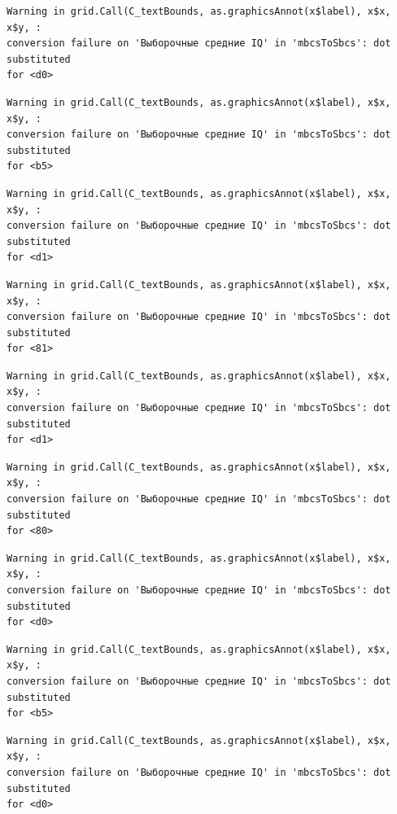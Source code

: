 \documentclass[
  letterpaper,
  DIV=11,
  numbers=noendperiod]{scrreprt}
\theoremstyle{definition}
\theoremstyle{remark}
\begin{document}
\begin{verbatim}
Warning in grid.Call(C_textBounds, as.graphicsAnnot(x$label), x$x, x$y, :
conversion failure on 'Выборочные средние IQ' in 'mbcsToSbcs': dot substituted
for <d0>
\end{verbatim}

\begin{verbatim}
Warning in grid.Call(C_textBounds, as.graphicsAnnot(x$label), x$x, x$y, :
conversion failure on 'Выборочные средние IQ' in 'mbcsToSbcs': dot substituted
for <b5>
\end{verbatim}

\begin{verbatim}
Warning in grid.Call(C_textBounds, as.graphicsAnnot(x$label), x$x, x$y, :
conversion failure on 'Выборочные средние IQ' in 'mbcsToSbcs': dot substituted
for <d1>
\end{verbatim}

\begin{verbatim}
Warning in grid.Call(C_textBounds, as.graphicsAnnot(x$label), x$x, x$y, :
conversion failure on 'Выборочные средние IQ' in 'mbcsToSbcs': dot substituted
for <81>
\end{verbatim}

\begin{verbatim}
Warning in grid.Call(C_textBounds, as.graphicsAnnot(x$label), x$x, x$y, :
conversion failure on 'Выборочные средние IQ' in 'mbcsToSbcs': dot substituted
for <d1>
\end{verbatim}

\begin{verbatim}
Warning in grid.Call(C_textBounds, as.graphicsAnnot(x$label), x$x, x$y, :
conversion failure on 'Выборочные средние IQ' in 'mbcsToSbcs': dot substituted
for <80>
\end{verbatim}

\begin{verbatim}
Warning in grid.Call(C_textBounds, as.graphicsAnnot(x$label), x$x, x$y, :
conversion failure on 'Выборочные средние IQ' in 'mbcsToSbcs': dot substituted
for <d0>
\end{verbatim}

\begin{verbatim}
Warning in grid.Call(C_textBounds, as.graphicsAnnot(x$label), x$x, x$y, :
conversion failure on 'Выборочные средние IQ' in 'mbcsToSbcs': dot substituted
for <b5>
\end{verbatim}

\begin{verbatim}
Warning in grid.Call(C_textBounds, as.graphicsAnnot(x$label), x$x, x$y, :
conversion failure on 'Выборочные средние IQ' in 'mbcsToSbcs': dot substituted
for <d0>
\end{verbatim}
\end{document}
